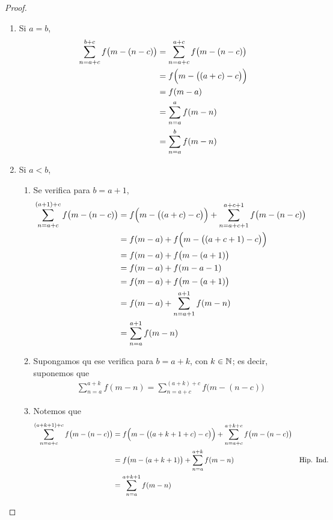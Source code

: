 \begin{enumerate}[label=\alph*)]
\begin{proof}
\begin{enumerate}[label=\roman*)]
    \item Si $a=b$,
    \begin{align*}
      \sum_{n=a+c}^{b+c} f\bigl(m-(n-c)\bigr) &= \sum_{n=a+c}^{a+c} f\bigl(m-(n-c)\bigr)\\
      &= f\Bigl(m-\bigl((a+c)-c\bigr)\Bigr)\\
      &= f(m-a)\\
      &= \sum_{n=a}^a f(m-n)\\
      &= \sum_{n=a}^b f(m-n)
    \end{align*}

    \item Si $a<b$,
    \begin{enumerate}[label=\roman*)]
      \item Se verifica para $b=a+1$,
      \begin{align*}
        \sum_{n=a+c}^{(a+1)+c} f\bigl(m-(n-c)\bigr) &= f\Bigl(m-\bigl((a+c)-c\bigr)\Bigr) + \sum_{n=a+c+1}^{a+c+1} f\bigl(m-(n-c)\bigr)\\
        &= f(m-a) + f\Bigl(m-\bigl((a+c+1)-c\bigr)\Bigr)\\
        &= f(m-a) + f\bigl(m-(a+1)\bigr)\\
        &= f(m-a) + f(m-a-1)\\
        &= f(m-a) + f\bigl(m-(a+1)\bigr)\\
        &= f(m-a) + \sum_{n=a+1}^{a+1} f(m-n)\\
        &= \sum_{n=a}^{a+1} f(m-n)
      \end{align*}

      \item Supongamos qu ese verifica para $b=a+k$, con $k\in \mathbb{N}$; es decir, suponemos que
      \begin{align*}
        \sum_{n=a}^{a+k} f(m-n) = \sum_{n=a+c}^{(a+k)+c} f\bigl(m-(n-c)\bigr)
      \end{align*}

      \item Notemos que
      \begin{align*}
        \sum_{n=a+c}^{(a+k+1)+c} f\bigl(m-(n-c)\bigr) &= f\Bigl(m-\bigl((a+k+1+c)-c\bigr)\Bigr) + \sum_{n=a+c}^{a+k+c} f\bigl(m-(n-c)\bigr)\\
        &= f\bigl(m-(a+k+1)\bigr) + \sum_{n=a}^{a+k} f(m-n) && \text{Hip. Ind.}\\
        &= \sum_{n=a}^{a+k+1} f(m-n)
      \end{align*}
    \end{enumerate}
  \end{enumerate}
  \end{proof}


\end{enumerate}
